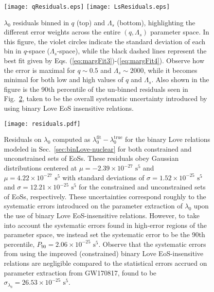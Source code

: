 \documentclass[prd,twocolumn,nofootinbib,superscriptaddress,amsmath,amssymb]{revtex4-1}
\begin{document}
\begin{figure}
\begin{center} 
\texttt{[image: qResiduals.eps]}
\texttt{[image: LsResiduals.eps]}
\end{center}
\caption{
$\lambda_0$ residuals binned in $q$ (top) and $\Lambda_s$ (bottom), highlighting the different error weights across the entire $(q,\Lambda_s)$ parameter space.
In this figure, the violet circles indicate the standard deviation of each bin in $q$-space ($\Lambda_s$-space), while the black dashed lines represent the best fit given by Eqs. (\ref{eq:margFit3})-(\ref{eq:margFit4}).
Observe how the error is maximal for $q\sim0.5$ and $\Lambda_s\sim2000$, while it becomes minimal for both low and high values of $q$ and $\Lambda_s$.
Also shown in the figure is the 90th percentile of the un-binned residuals seen in Fig.~\ref{fig:residuals}, taken to be the overall systematic uncertainty introduced by using binary Love EoS insensitive relations.
}
\label{fig:qLsResiduals}
\end{figure}

\begin{figure}
\begin{center} 
\texttt{[image: residuals.pdf]}
\end{center}
\caption{
Residuals on $\lambda_0$ computed as $\lambda_0^{\text{fit}}-\lambda_0^{\text{true}}$ for the binary Love relations modeled in Sec.~\ref{sec:binLove-nuclear} for both constrained and unconstrained sets of EoSs.
These residuals obey Gaussian distributions centered at $\mu=-2.39 \times 10^{-27} \text{ s}^5$ and $\mu=4.22 \times 10^{-27} \text{ s}^5$ with standard deviations of $\sigma=1.52\times10^{-25} \text{ s}^5$ and $\sigma=12.21\times10^{-25} \text{ s}^5$ for the constrained and unconstrained sets of EoSs, respectively.
These uncertainties correspond roughly to the systematic errors introduced on the parameter extraction of $\lambda_0$ upon the use of binary Love EoS-insensitive relations.
However, to take into account the systematic errors found in high-error regions of the parameter space, we instead set the systematic error to be the 90th percentile, $P_{90}=2.06\times10^{-25} \text{ s}^5$.
Observe that the systematic errors from using the improved (constrained) binary Love EoS-insensitive relations are negligible compared to the statistical errors accrued on parameter extraction from GW170817, found to be $\sigma_{\lambda_0}=26.53 \times 10^{-25} \text{ s}^5$.
}
\label{fig:residuals}
\end{figure}
\end{document}
